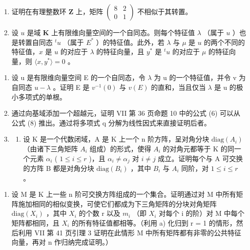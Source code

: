 \begin{enumerate}
\def\labelenumi{\alph{enumi})}
\setcounter{enumi}{1}
\item
  证明在有理整数环 \(\mathbf{Z}\) 上，矩阵 \(\begin{pmatrix} 8 & 2 \\ 0 & 1 \end{pmatrix}\) 不相似于其转置。
\item
  设 \(u\) 是域 \(\mathbf{K}\) 上有限维向量空间的一个自同态。则每个特征值 \(\lambda\) （属于 \(u\) ）也是转置自同态 \(^t u\) （属于 \(E^*\) ）的特征值。此外，若 \(\lambda\) 与 \(\mu\) 是 \(u\) 的两个不同的特征值，\(x\) 是 \(u\) 的对应于 \(\lambda\) 的特征向量，且 \(y^*\) 是 \(^t u\) 的对应于 \(\mu\) 的特征向量，则 \(\langle x, y^* \rangle = 0\) 。
\end{enumerate}

\begin{enumerate}
\def\labelenumi{\arabic{enumi})}
\setcounter{enumi}{2}
\item
  设 u 是有限维向量空间 E 的一个自同态，令 \(\lambda\) 为 u 的一个特征值，并令 v 为自同态 \(u - \lambda\) 。证明 E 是 \(v^{-1}(0)\) 与 \(v(E)\) 的直和，当且仅当 \(\lambda\) 是 u 的极小多项式的单根。
\item
  通过向基域添加一个超越元，证明 VII 第 36 页命题 10 中的公式 (6) 可以从公式 (8) 推出。通过将多项式 q 分解为线性因式来直接证明后者。
\item
  \begin{enumerate}
  \def\labelenumii{\alph{enumii})}
  \tightlist
  \item
    设 K 是一个代数闭域，A 是 K 上一个 n 阶方阵，呈对角分块 \(\text{diag}(A_i)\) （由诸下三角矩阵 \(A_i\) 组成）的形式，使得 \(A_i\) 的对角元都等于 K 的同一个元素 \(\alpha_i\) ( \(1 \leqslant i \leqslant r\) )，且 \(\alpha_i \neq \alpha_j\) 对 \(i \neq j\) 成立。证明每个与 A 可交换的方阵 B 都是对角分块 \(\text{diag}(B_i)\) ，其中 \(B_i\) 与 \(A_i\) 同阶，对 \(1 \leqslant i \leqslant r\) 。
  \end{enumerate}
\end{enumerate}

\begin{enumerate}
\def\labelenumi{\alph{enumi})}
\setcounter{enumi}{1}
\tightlist
\item
  设 M 是 K 上一些 n 阶可交换方阵组成的一个集合。证明通过对 M 中所有矩阵施加相同的相似变换，可使它们都成为下三角矩阵的分块对角矩阵 \(\text{diag}(X_i)\) ，其中 \(X_i\) 的个数 r 以及 \(m_i\) （即 \(X_i\) 对每个 i 的阶）对 M 中每个矩阵都相同，且 \(X_i\) 的所有特征值都相等。（利用 a) 化归到 r = 1 的情形，然后利用 VII 第 41 页引理 3 证明在此情形 M 中所有矩阵都有非零的公共特征向量，再对 n 作归纳完成证明。）
\end{enumerate}

